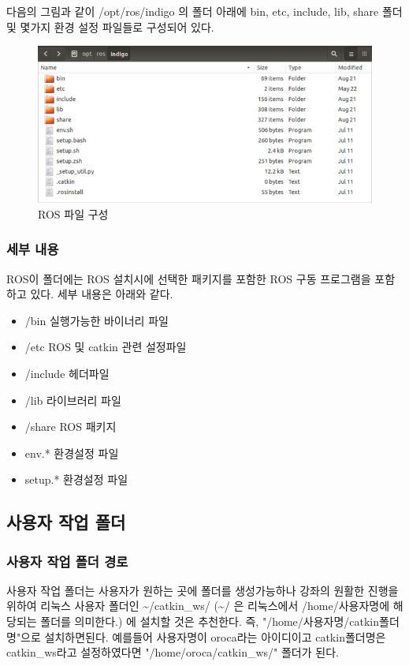다음의 그림과 같이 /opt/ros/indigo 의 폴더 아래에 bin, etc, include, lib, share 폴더 및 몇가지 환경 설정 파일들로 구성되어 있다. 

\begin{figure}[h]
\centering\includegraphics[width=0.5\columnwidth]{pictures/chapter4/folders.png}
\caption{ROS 파일 구성}
\end{figure}

\subsubsection{세부 내용}
ROS이 폴더에는 ROS 설치시에 선택한 패키지를 포함한 ROS 구동 프로그램을 포함하고 있다. 세부 내용은 아래와 같다.

\begin{itemize}
\item /bin 실행가능한 바이너리 파일
\item /etc ROS 및 catkin 관련 설정파일
\item /include 헤더파일
\item /lib 라이브러리 파일
\item /share ROS 패키지
\item env.* 환경설정 파일
\item setup.* 환경설정 파일
\end{itemize}

\subsection{사용자 작업 폴더}

\subsubsection{사용자 작업 폴더 경로}

사용자 작업 폴더는 사용자가 원하는 곳에 폴더를 생성가능하나 강좌의 원활한 진행을 위하여 리눅스 사용자 폴더인 \textasciitilde/catkin\_ws/ (\textasciitilde/ 은 리눅스에서 /home/사용자명에 해당되는 폴더를 의미한다.) 에 설치할 것은 추천한다. 즉, "/home/사용자명/catkin폴더명"으로 설치하면된다. 예를들어 사용자명이 oroca라는 아이디이고 catkin폴더명은 catkin\_ws라고 설정하였다면 "/home/oroca/catkin\_ws/" 폴더가 된다.

